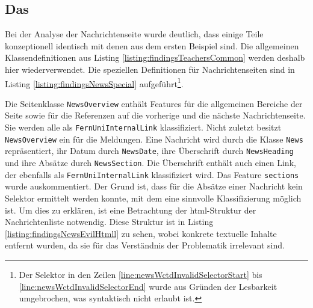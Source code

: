 \subsection{Das {\classificationModel}}
    \label{section:findingsNewsClasses}
    Bei der Analyse der Nachrichtenseite wurde deutlich,
    dass einige Teile konzeptionell identisch mit denen aus dem ersten Beispiel sind.
    Die allgemeinen Klassendefinitionen aus Listing \ref{listing:findingsTeachersCommon}
    werden deshalb hier wiederverwendet.
    Die speziellen Definitionen für Nachrichtenseiten sind in
    Listing \ref{listing:findingsNewsSpecial}
    aufgeführt\footnote{Der Selektor in den Zeilen \ref{line:newsWctdInvalidSelectorStart}
    bis \ref{line:newsWctdInvalidSelectorEnd} wurde aus Gründen der Lesbarkeit umgebrochen,
    was syntaktisch nicht erlaubt ist.}.

    

    Die Seitenklasse \texttt{NewsOverview} enthält Features für die
    allgemeinen Bereiche der Seite sowie für die Referenzen auf die vorherige und die nächste
    Nachrichtenseite. Sie werden alle als \texttt{FernUniInternalLink} klassifiziert.
    Nicht zuletzt besitzt \texttt{NewsOverview} ein {\collectionFeature} für die Meldungen.
    Eine Nachricht wird durch die Klasse \texttt{News} repräsentiert,
    ihr Datum durch \texttt{NewsDate}, ihre Überschrift durch \texttt{NewsHeading}
    und ihre Absätze durch \texttt{NewsSection}.
    Die Überschrift enthält auch einen Link,
    der ebenfalls als \texttt{FernUniInternalLink} klassifiziert wird.
    Das Feature \texttt{sections} wurde auskommentiert.
    Der Grund ist, dass für die Absätze einer Nachricht kein Selektor ermittelt werden konnte,
    mit dem eine sinnvolle Klassifizierung möglich ist.
    Um dies zu erklären, ist eine Betrachtung der \gls{html}-Struktur der Nachrichtenliste notwendig.
    Diese Struktur ist in Listing \ref{listing:findingsNewsEvilHtmll}
    zu sehen, wobei konkrete textuelle Inhalte entfernt wurden,
    da sie für das Verständnis der Problematik irrelevant sind.

    

